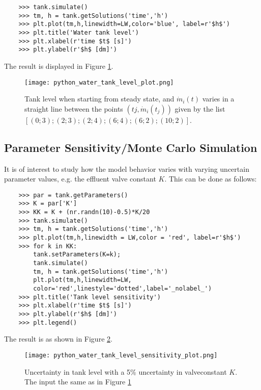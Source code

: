\begin{lstlisting}
	>>> tank.simulate()
	>>> tm, h = tank.getSolutions('time','h')
	>>> plt.plot(tm,h,linewidth=LW,color='blue', label=r'$h$')
	>>> plt.title('Water tank level')
	>>> plt.xlabel(r'time $t$ [s]')
	>>> plt.ylabel(r'$h$ [dm]')
\end{lstlisting}

The result is displayed in Figure \ref{fig:pythonwatertanklevelplot}.

\begin{figure}
	\texttt{[image: python\_water\_tank\_level\_plot.png]}
	\caption{Tank level when starting from steady state, and $\dot{m}_i(t)$ varies in a straight line between the points $(tj,\dot{m}_i(t_j ))$
		given by the list $[(0; 3); (2; 3); (2; 4); (6; 4); (6; 2); (10; 2)]$.}
	\label{fig:pythonwatertanklevelplot}
\end{figure}

\subsection{Parameter Sensitivity/Monte Carlo Simulation}
\label{subsec:pythonparametersensitivity}

It is of interest to study how the model behavior varies
with varying uncertain parameter values, e.g. the effluent
valve constant $K$. This can be done as follows:

\begin{lstlisting}
	>>> par = tank.getParameters()
	>>> K = par['K']
	>>> KK = K + (nr.randn(10)-0.5)*K/20
	>>> tank.simulate()
	>>> tm, h = tank.getSolutions('time','h')
	>>> plt.plot(tm,h,linewidth = LW,color = 'red', label=r'$h$')
	>>> for k in KK:
		tank.setParameters(K=k);
		tank.simulate()
		tm, h = tank.getSolutions('time','h')
		plt.plot(tm,h,linewidth=LW,
		color='red',linestyle='dotted',label='_nolabel_')
	>>> plt.title('Tank level sensitivity')
	>>> plt.xlabel(r'time $t$ [s]')
	>>> plt.ylabel(r'$h$ [dm]')
	>>> plt.legend()
\end{lstlisting}


The result is as shown in Figure \ref{fig:pythonwatertanklevelsensitivityplot}.

\begin{figure}
	\texttt{[image: python\_water\_tank\_level\_sensitivity\_plot.png]}
	\caption{Uncertainty in tank level with a 5\% uncertainty in valveconstant $K$. The input the same as in Figure \ref{fig:pythonwatertanklevelplot}}
	\label{fig:pythonwatertanklevelsensitivityplot}
\end{figure}

